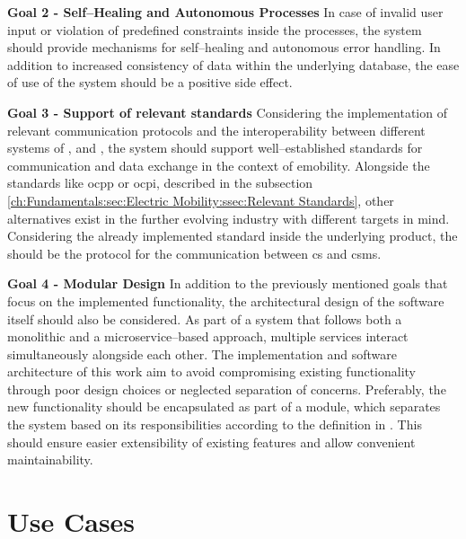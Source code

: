 \noindent \textbf{Goal 2 - Self--Healing and Autonomous Processes} In case of invalid user input or violation of predefined constraints inside the processes, the system should provide mechanisms for self--healing and autonomous error handling. 
In addition to increased consistency of data within the underlying database, the ease of use of the system should be a positive side effect.

\noindent \textbf{Goal 3 - Support of relevant standards} Considering the implementation of relevant communication protocols and the interoperability between different systems of ,  and , the system should support well--established standards for communication and data exchange in the context of \acrshort{emobility}. 
Alongside the standards like \acrshort{ocpp} or \acrshort{ocpi}, described in the subsection \ref{ch:Fundamentals:sec:Electric Mobility:ssec:Relevant Standards}, other alternatives exist in the further evolving industry with different targets in mind. 
Considering the already implemented standard inside the underlying product, the  should be the protocol for the communication between \acrshort{cs} and \acrshort{csms}.

\noindent \textbf{Goal 4 - Modular Design} In addition to the previously mentioned goals that focus on the implemented functionality, the architectural design of the software itself should also be considered. 
As part of a system that follows both a monolithic and a microservice--based approach, multiple services interact simultaneously alongside each other. The implementation and software architecture of this work aim to avoid compromising existing functionality through poor design choices or neglected separation of concerns. 
Preferably, the new functionality should be encapsulated as part of a module, which separates the system based on its responsibilities according to the definition in \cite{clements_documenting_2011}. This should ensure easier extensibility of existing features and allow convenient maintainability.

\newpage

\section{Use Cases}
\label{ch:Requirements Engineering:sec:Use Cases}

